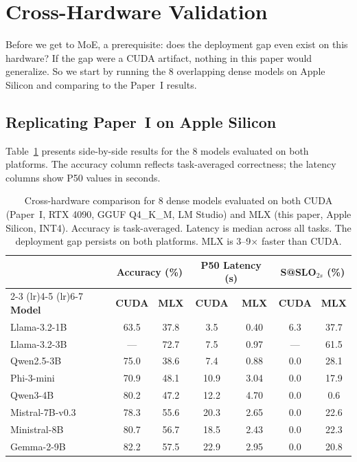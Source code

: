 \documentclass[11pt]{article}
\begin{document}
\section{Cross-Hardware Validation}
\label{sec:cross-hardware}

Before we get to MoE, a prerequisite: does the deployment gap even exist on this hardware? If the gap were a CUDA artifact, nothing in this paper would generalize.  So we start by running the 8 overlapping dense models on Apple Silicon and comparing to the Paper~I results.

\subsection{Replicating Paper~I on Apple Silicon}
\label{sec:replicating-p1}

Table~\ref{tab:cross-hardware} presents side-by-side results for the 8 models evaluated on both platforms.  The accuracy column reflects task-averaged correctness; the latency columns show P50 values in seconds.

\begin{table}[t]
\centering
\caption{Cross-hardware comparison for 8 dense models evaluated on both CUDA (Paper~I, RTX 4090, GGUF Q4\_K\_M, LM Studio) and MLX (this paper, Apple Silicon, INT4).  Accuracy is task-averaged.  Latency is median across all tasks.  The deployment gap persists on both platforms.  MLX is 3--9$\times$ faster than CUDA.}
\label{tab:cross-hardware}
\small
\begin{tabular}{l cc cc cc}
\toprule
& \multicolumn{2}{c}{\textbf{Accuracy (\%)}} & \multicolumn{2}{c}{\textbf{P50 Latency (s)}} & \multicolumn{2}{c}{\textbf{S@SLO$_{2s}$ (\%)}} \\
\cmidrule(lr){2-3} \cmidrule(lr){4-5} \cmidrule(lr){6-7}
\textbf{Model} & \textbf{CUDA} & \textbf{MLX} & \textbf{CUDA} & \textbf{MLX} & \textbf{CUDA} & \textbf{MLX} \\
\midrule
Llama-3.2-1B   & 63.5 & 37.8 & 3.5  & 0.40 & 6.3  & 37.7 \\
Llama-3.2-3B   & ---  & 72.7 & 7.5  & 0.97 & ---  & 61.5 \\
Qwen2.5-3B     & 75.0 & 38.6 & 7.4  & 0.88 & 0.0  & 28.1 \\
Phi-3-mini      & 70.9 & 48.1 & 10.9 & 3.04 & 0.0  & 17.9 \\
Qwen3-4B        & 80.2 & 47.2 & 12.2 & 4.70 & 0.0  & 0.6  \\
Mistral-7B-v0.3 & 78.3 & 55.6 & 20.3 & 2.65 & 0.0  & 22.6 \\
Ministral-8B    & 80.7 & 56.7 & 18.5 & 2.43 & 0.0  & 22.3 \\
Gemma-2-9B      & 82.2 & 57.5 & 22.9 & 2.95 & 0.0  & 20.8 \\
\bottomrule
\end{tabular}
\end{table}
\end{document}
